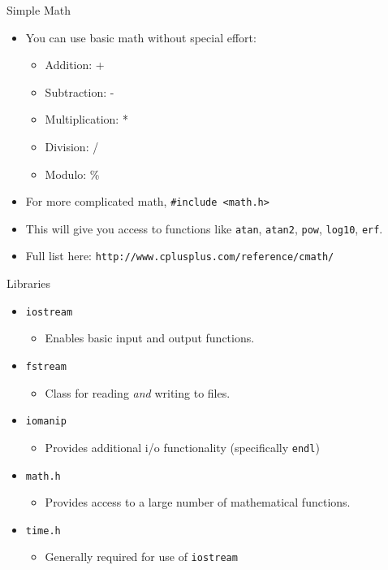 \documentclass[compress]{beamer}
\begin{document}
    \begin{frame}{Simple Math}
    	\begin{itemize}
    		\item You can use basic math without special effort:
    		\begin{itemize}
    			\item Addition: +
    			\item Subtraction: -
    			\item Multiplication: *
    			\item Division: /
    			\item Modulo: \%
    		\end{itemize}
    		\item For more complicated math, \texttt{\#include <math.h>}
    		\item This will give you access to functions like \texttt{atan}, \texttt{atan2}, \texttt{pow}, \texttt{log10}, \texttt{erf}.
    		\item Full list here: \texttt{http://www.cplusplus.com/reference/cmath/}
    	\end{itemize}
    \end{frame}
    
    \begin{frame}{Libraries}
    	\begin{itemize}
    		\item \texttt{iostream}
    		\begin{itemize}
    			\item Enables basic input and output functions. 
    		\end{itemize}
    		\item \texttt{fstream}
    		\begin{itemize}
    			\item Class for reading \textit{and} writing to files.
    		\end{itemize}
    		\item \texttt{iomanip}
    		\begin{itemize}
    			\item Provides additional i/o functionality (specifically \texttt{endl}) 
    		\end{itemize}
    		\item \texttt{math.h}
    		\begin{itemize}
    			\item Provides access to a large number of mathematical functions. 
    		\end{itemize}
    		\item \texttt{time.h}
    		\begin{itemize}
    			\item Generally required for use of \texttt{iostream}
    		\end{itemize}
    	\end{itemize}
    \end{frame}
    
\end{document}

